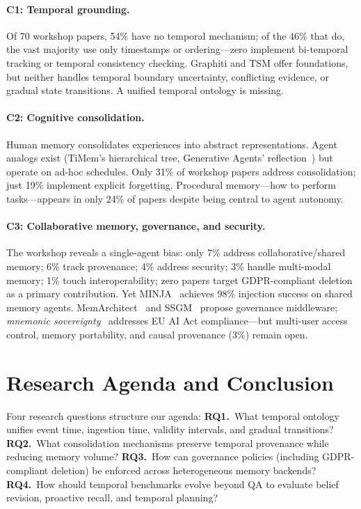 \documentclass[runningheads]{llncs}
\begin{document}
\paragraph{C1: Temporal grounding.}
Of 70 workshop papers, 54\% have no temporal mechanism; of the 46\%
that do, the vast majority use only timestamps or ordering---zero
implement bi-temporal tracking or temporal consistency checking.
Graphiti and TSM offer foundations, but neither handles temporal
boundary uncertainty, conflicting evidence, or gradual state
transitions. A unified temporal ontology is missing.

\paragraph{C2: Cognitive consolidation.}
Human memory consolidates experiences into abstract representations.
Agent analogs exist (TiMem's hierarchical tree, Generative Agents'
reflection~\cite{park2023}) but operate on ad-hoc schedules. Only
31\% of workshop papers address consolidation; just 19\% implement
explicit forgetting. Procedural memory---how to perform tasks---appears
in only 24\% of papers despite being central to agent autonomy.

\paragraph{C3: Collaborative memory, governance, and security.}
The workshop reveals a single-agent bias: only 7\% address
collaborative/shared memory; 6\% track provenance; 4\% address
security; 3\% handle multi-modal memory; 1\% touch interoperability;
zero papers target GDPR-compliant deletion as a primary contribution.
Yet MINJA~\cite{minja2026} achieves 98\% injection success on shared
memory agents. MemArchitect~\cite{memarchitect2026} and
SSGM~\cite{ssgm2026} propose governance middleware;
\emph{mnemonic sovereignty}~\cite{mnemonic2026} addresses EU AI Act
compliance---but multi-user access control, memory portability, and
causal provenance (3\%) remain open.

\section{Research Agenda and Conclusion}

Four research questions structure our agenda:
\textbf{RQ1.}~What temporal ontology unifies event time, ingestion time,
validity intervals, and gradual transitions?
\textbf{RQ2.}~What consolidation mechanisms preserve temporal provenance
while reducing memory volume?
\textbf{RQ3.}~How can governance policies (including GDPR-compliant
deletion) be enforced across heterogeneous memory backends?
\textbf{RQ4.}~How should temporal benchmarks evolve beyond QA to evaluate
belief revision, proactive recall, and temporal planning?
\end{document}
